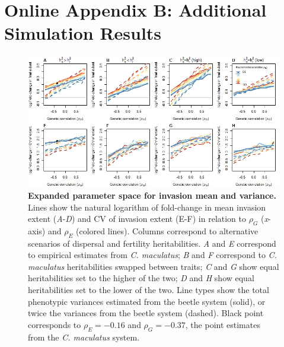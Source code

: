 \documentclass[11pt]{article}
\begin{document}
\newpage{}
\section*{Online Appendix B: Additional Simulation Results}
\renewcommand{\thefigure}{B\arabic{figure}}\setcounter{figure}{0}
\setcounter{figure}{0}

\begin{figure}[h!]
\centering
\includegraphics[width=1\linewidth]{Figures/sim_invasions_vary_h2_vary_Pvar}
\caption{\textbf{Expanded parameter space for invasion mean and variance.}
Lines show the natural logarithm of fold-change in mean invasion extent (\textit{A}-\textit{D}) and CV of invasion extent (E-F) in relation to $\rho_{G}$ (\textit{x}-axis) and $\rho_{E}$ (colored lines). Columns correspond to alternative scenarios of dispersal and fertility heritabilities. \textit{A} and \textit{E} correspond to empirical estimates from \textit{C. maculatus}; \textit{B} and \textit{F} correspond to \textit{C. maculatus} heritabilities swapped between traits; \textit{C} and \textit{G} show equal heritabilities set to the higher of the two; \textit{D} and \textit{H} show equal heritabilities set to the lower of the two. 
Line types show the total phenotypic variances estimated from the beetle system (solid), or twice the variances from the beetle system (dashed).
Black point corresponds to $\rho_{E} = -0.16$ and $\rho_{G} = -0.37$, the point estimates from the \textit{C. maculatus} system.}
\label{corr:sim_vary_h2_Pvar}
\end{figure}

\newpage{}
\end{document}
